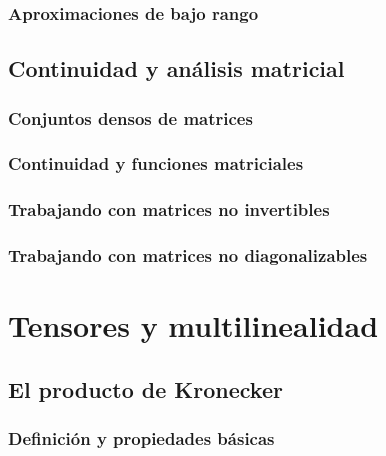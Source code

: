 \subsubsection{Aproximaciones de bajo rango} %
\label{ssub:aproximaciones_de_bajo_rango}

\subsection{Continuidad y análisis matricial} %
\label{sub:continuidad_y_analisis_matricial}

\subsubsection{Conjuntos densos de matrices} %
\label{ssub:conjuntos_densos_de_matrices}

\subsubsection{Continuidad y funciones matriciales} %
\label{ssub:continuidad_y_funciones_matriciales}

\subsubsection{Trabajando con matrices no invertibles} %
\label{ssub:trabajando_con_matrices_no_invertibles}

\subsubsection{Trabajando con matrices no diagonalizables} %
\label{ssub:trabajando_con_matrices_no_diagonalizables}

\section{Tensores y multilinealidad} %
\label{sec:tensores_y_multilinealidad}

\subsection{El producto de Kronecker} %
\label{sub:el_producto_de_kronecker}

\subsubsection{Definición y propiedades básicas} %
\label{ssub:definicion_y_propiedades_basicas}

